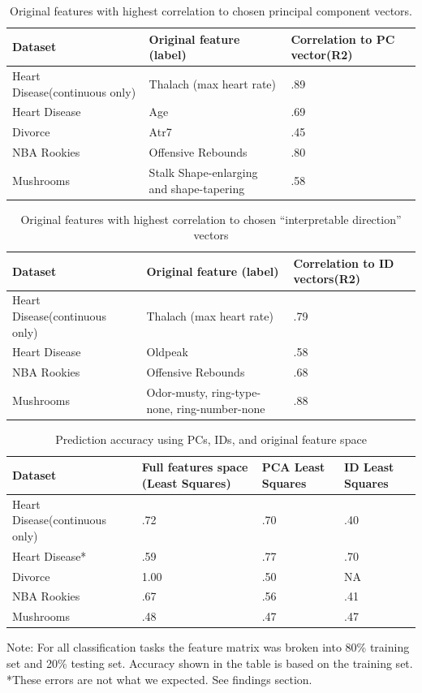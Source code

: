 \documentclass{article}
\begin{document}
\begin{table}
	\caption{ Original features with highest correlation to chosen principal component vectors.}
	\centering
	\begin{tabular}{lll}
    \toprule
	\midrule
	Dataset     & Original feature (label)     & Correlation to PC vector(R2) \\
	\midrule
	\midrule
	Heart Disease(continuous only) & Thalach (max heart rate) & .89     \\
	\midrule
	Heart Disease & Age & .69     \\
	\midrule
	Divorce     & Atr7  & .45    \\
	\midrule
	NBA Rookies     & Offensive Rebounds   & .80 \\
	\midrule
	Mushrooms     & Stalk Shape-enlarging and shape-tapering   & .58 \\
	\bottomrule
	\end{tabular}
\end{table}

\begin{table}
	\caption{Original features with highest correlation to chosen “interpretable direction” vectors }
	\centering
	\begin{tabular}{lll}
		\toprule
		\midrule
		Dataset     & Original feature (label)     & Correlation to ID vectors(R2) \\
		\midrule
		\midrule
		Heart Disease(continuous only) & Thalach (max heart rate) & .79     \\
		\midrule
		Heart Disease & Oldpeak & .58     \\
		\midrule
		NBA Rookies     & Offensive Rebounds   & .68 \\
		\midrule
		Mushrooms  & Odor-musty, ring-type-none, ring-number-none   & .88 \\
		\bottomrule
	\end{tabular}
\end{table}


\begin{table}
	\caption{ Prediction accuracy using PCs, IDs, and original feature space}
	\centering
	
	\begin{tabular}{llll}
		\toprule
		\midrule	
		Dataset     & Full features space (Least Squares) & PCA Least Squares & ID Least Squares \\
		\midrule
		\midrule
		Heart Disease(continuous only) & .72 & .70 & .40    \\
		\midrule
		Heart Disease*  & .59 & .77 & .70    \\
		\midrule
		Divorce     & 1.00 & .50 & NA  \\
		\midrule
		NBA Rookies   & .67 & .56 & .41    \\
		\midrule
		Mushrooms     & .48 & .47 & .47    \\
		\bottomrule
	\end{tabular}
Note: For all classification tasks the feature matrix was broken into 80\% training set and 20\% testing set. 
Accuracy shown in the table is based on the training set.
*These errors are not what we expected. See findings section.
\end{table}
\end{document}
